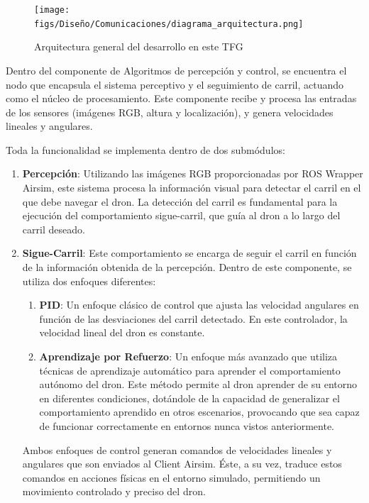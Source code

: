 \begin{figure} [H]
  \begin{center}
    \texttt{[image: figs/Diseño/Comunicaciones/diagrama\_arquitectura.png]}
  \end{center}
  \caption{Arquitectura general del desarrollo en este TFG}
  \label{fig:infraestructura}
  \vspace{-1.5em}
\end{figure}

Dentro del componente de Algoritmos de percepción y control, se encuentra el nodo que encapsula el sistema perceptivo y el seguimiento de carril, actuando como el núcleo de 
procesamiento. Este componente recibe y procesa las entradas de los sensores (imágenes RGB, altura y localización), y genera velocidades lineales y angulares.

Toda la funcionalidad se implementa dentro de dos submódulos:
\begin{enumerate}
  \item \textbf{Percepción}: Utilizando las imágenes RGB proporcionadas por ROS Wrapper Airsim, este sistema procesa la información
  visual para detectar el carril en el que debe navegar el dron. La detección del carril es fundamental para la ejecución del comportamiento sigue-carril, que guía al dron 
  a lo largo del carril deseado. 
  \item \textbf{Sigue-Carril}: Este comportamiento se encarga de seguir el carril en función de la información obtenida de la percepción. Dentro de este componente, se 
  utiliza dos enfoques diferentes: 
  \begin{enumerate}
    \item \textbf{PID}: Un enfoque clásico de control que ajusta las velocidad angulares en función de las desviaciones del carril detectado. En este controlador, la velocidad lineal 
    del dron es constante.
    \item \textbf{Aprendizaje por Refuerzo}: Un enfoque más avanzado que utiliza técnicas de aprendizaje automático para aprender el comportamiento autónomo del dron. Este método 
    permite al dron aprender de su entorno en diferentes condiciones, dotándole de la capacidad de generalizar el comportamiento aprendido en otros escenarios, provocando que sea capaz de funcionar correctamente
    en entornos nunca vistos anteriormente.

  \end{enumerate}

  Ambos enfoques de control generan comandos de velocidades lineales y angulares que son enviados al Client Airsim. Éste, a su vez, traduce estos comandos en acciones físicas 
  en el entorno simulado, permitiendo un movimiento controlado y preciso del dron. 


\end{enumerate}

